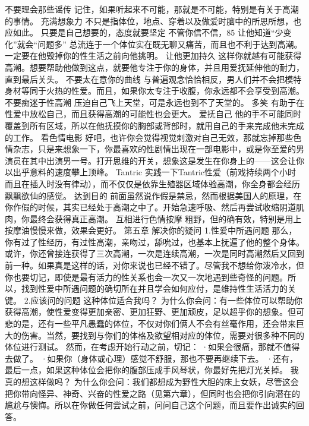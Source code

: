 \documentclass[12pt,UTF8]{ctexbook}
\begin{document}
不要理会那些谣传
记住，如果听起来不可能，那就是不可能，特别是有关于高潮的事情。
充满想象力
不只是指体位，地点、穿着以及做爱时脑中的所思所想，也应如此。
只要是自己想要的，态度就要坚定
不管你信不信，85%
让他知道“少变化”就会“问题多”
总流连于一个体位实在既无聊又痛苦，而且也不利于达到高潮。一定要在他毁掉你的性生活之前向他挑明。
让他更加持久
这样你就越有可能获得高潮。想要帮助他做到这点，就要他专注于你的身体，并且用爱抚延伸他的耐力，直到最后关头。
不要太在意你的曲线
与普遍观念恰恰相反，男人们并不会把模特身材等同于火热的性爱。而且，如果你太专注于收腹，你永远都不会享受到高潮。
不要痴迷于性高潮
压迫自己飞上天堂，可是永远也到不了天堂的。
多笑
有助于在性爱中放松自己，而且获得高潮的可能性也会更大。
爱抚自己
他的手不可能同时覆盖到所有区域，所以在他抚摸你的胸部或背部时，就用自己的手来完成他未完成的工作。
看色情电影
好吧，也许你会觉得视觉刺激对自己无效，那就忘掉那些色情杂志，只是来想象一下，你最喜欢的性剧情出现在一部电影中，或是你至爱的男演员在其中出演男一号。打开思维的开关，想象这是发生在你身上的——这会让你以出乎意料的速度攀上顶峰。
Tantric
实践一下Tantric性爱（前戏持续两个小时而且在插入时没有律动），而不仅仅是依靠生殖器区域体验高潮，你全身都会经历飘飘欲仙的感觉。
达到目的
前面虽然说作假是禁忌，然而根据美国人的原理，在你作假的时候，其实已经处于高潮之中了。开始急速呼吸、然后再尝试收缩阴道肌肉，你最终会获得真正高潮。
互相进行色情按摩
粗野，但的确有效，特别是用上按摩油慢慢来做，效果会更好。
第五章 解决你的疑问
1.性爱中所遇问题
那么，你有过了性经历，有过性高潮，亲吻过，舔吮过，也基本上抚遍了他的整个身体。或许，你还曾接连获得了三次高潮，一次是连续高潮，一次是同时高潮然后又回到前一种。如果真是这样的话，对你来说也已经不错了。尽管我不想给你泼冷水，但你也要切记，即使是最有活力的性关系也会一次又一次地遇到些奇怪的问题。所以，找到性爱中所遇问题的确切所在并且学会如何应付，是维持性生活活力的关键。
2.应该问的问题
这种体位适合我吗？
为什么你会问：有一些体位可以帮助你获得高潮，使性爱变得更加亲密、更加狂野、更加顽皮，足以超乎你的想象。但可悲的是，还有一些平凡愚蠢的体位，不仅对你们俩人不会有丝毫作用，还会带来巨大的伤害。当然，要找到与你们的体格及欲望相对应的体位，需要对很多种不同的体位进行测试。
然而，在考虑开始行动之前，切记：
·如果会很痛，那就不值得去做了。
·如果你（身体或心理）感觉不舒服，那也不要再继续下去。
·还有，最后一点，如果这种体位会把你的腹部压成手风琴状，你最好先把灯光关掉。
我真的想这样做吗？
为什么你会问：我们都想成为野性大胆的床上女妖，尽管这会把你带向怪异、神奇、兴奋的性爱之路（见第六章），但同时也会把你引向潜在的尴尬与懊悔。所以在你做任何尝试之前，问问自己这个问题，而且要作出诚实的回答。
\end{document}
